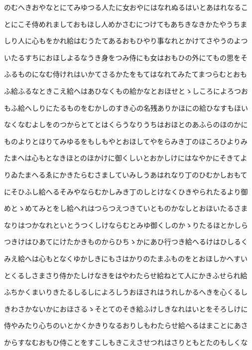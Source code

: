\documentclass[a4paper,11pt,landscape]{ltjtarticle}
\begin{document}
のむへきおやなとにてみゆつる人たに女おやにはなれぬるはいとあはれなるこ
\par\medskip
とにこそ侍めれましておもほし人めかさむにつけてもあちきなきかたやうちま
\par\medskip
しり人に心もをかれ給はむうたてあるおもひやり事なれとかけてさやうのよつ
\par\medskip
いたるすちにおほしよるなうき身をつみ侍にも女はおもひの外にてもの思をそ
\par\medskip
ふるものになむ侍けれはいかてさるかたをもてはなれてみたてまつらむとおも
\par\medskip
ふ給ふるなときこえ給へはあひなくもの給かなとおほせとゝしころによろつお
\par\medskip
もふ給へしりにたるものをむかしのすき心の名残ありかほにの給ひなすもほい
\par\medskip
なくなむよしをのつからとてとはくらうなりうちはおほとのあふらのほのかに
\par\medskip
ものよりとほりてみゆるをもしもやとおほしてやをらみき丁のほころひよりみ
\par\medskip
たまへは心もとなきほとのほかけに御くしいとおかしけにはなやかにそきてよ
\par\medskip
りゐたまへるゑにかきたらむさましていみしうあはれなり丁のひむかしおもて
\par\medskip
にそひふし給へるそみやならむかしみき丁のしとけなくひきやられたるより御
\par\medskip
めとゝめてみとをし給へれはつらつえつきていとものかなしとおほいたるさま
\par\medskip
なりはつかなれといとうつくしけならむとみゆ御くしのかゝりたるほとかしら
\par\medskip
つきけはひあてにけたかきものからひちゝかにあひ行つき給へるけはひしるく
\par\medskip
みえ給へは心もとなくゆかしきにもさはかりのたまふものをとおほしかへすい
\par\medskip
とくるしさまさり侍かたしけなきをはやわたらせ給ねとて人にかきふせられ給
\par\medskip
ふちかくまいりきたるしるしによろしうおほされはうれしかるへきを心くるし
\par\medskip
きわさかないかにおほさるゝそとてのそき給ふけしきなれはいとをそろしけに
\par\medskip
侍やみたり心ちのいとかくかきりなるおりしもわたらせ給へるはまことにあさ
\par\medskip
からすなむおもひ侍ことをすこしもきこえさせつれはさりともとたのもしくな
\par\medskip
\end{document}

